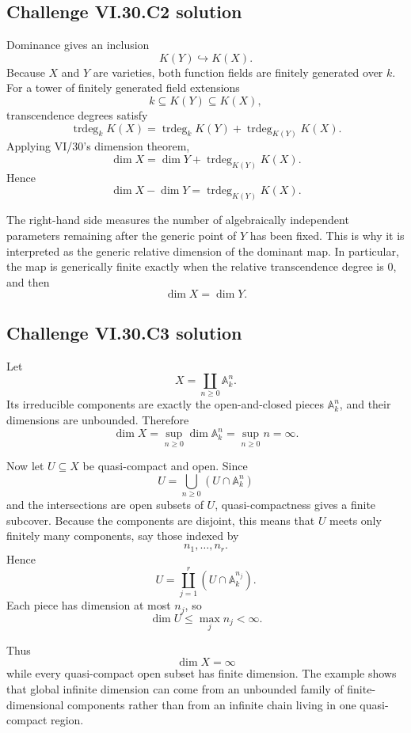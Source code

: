 \subsection*{Challenge VI.30.C2 solution}
\begin{solution}
Dominance gives an inclusion
\[
K(Y)\hookrightarrow K(X).
\]
Because \(X\) and \(Y\) are varieties, both function fields are finitely generated over \(k\). For a tower of
finitely generated field extensions
\[
k\subseteq K(Y)\subseteq K(X),
\]
transcendence degrees satisfy
\[
\operatorname{trdeg}_kK(X)
=
\operatorname{trdeg}_kK(Y)
+
\operatorname{trdeg}_{K(Y)}K(X).
\]
Applying VI/30's dimension theorem,
\[
\dim X
=
\dim Y
+
\operatorname{trdeg}_{K(Y)}K(X).
\]
Hence
\[
\boxed{
\dim X-\dim Y
=
\operatorname{trdeg}_{K(Y)}K(X).
}
\]

The right-hand side measures the number of algebraically independent parameters remaining after the generic
point of \(Y\) has been fixed. This is why it is interpreted as the generic relative dimension of the dominant
map. In particular, the map is generically finite exactly when the relative transcendence degree is \(0\), and
then
\[
\dim X=\dim Y.
\]
\end{solution}

\subsection*{Challenge VI.30.C3 solution}
\begin{solution}
Let
\[
X=\coprod_{n\ge0}\mathbb A^n_k.
\]
Its irreducible components are exactly the open-and-closed pieces \(\mathbb A^n_k\), and their dimensions are
unbounded. Therefore
\[
\dim X
=
\sup_{n\ge0}\dim\mathbb A^n_k
=
\sup_{n\ge0}n
=
\boxed{\infty}.
\]

Now let \(U\subseteq X\) be quasi-compact and open. Since
\[
U=\bigcup_{n\ge0}\left(U\cap\mathbb A^n_k\right)
\]
and the intersections are open subsets of \(U\), quasi-compactness gives a finite subcover. Because the components
are disjoint, this means that \(U\) meets only finitely many components, say those indexed by
\[
n_1,\ldots,n_r.
\]
Hence
\[
U=
\coprod_{j=1}^r\left(U\cap\mathbb A^{n_j}_k\right).
\]
Each piece has dimension at most \(n_j\), so
\[
\dim U
\le
\max_j n_j
<
\infty.
\]

Thus
\[
\boxed{\dim X=\infty}
\]
while every quasi-compact open subset has finite dimension. The example shows that global infinite dimension can
come from an unbounded family of finite-dimensional components rather than from an infinite chain living in one
quasi-compact region.
\end{solution}

